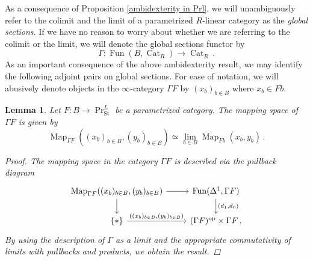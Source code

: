 \documentclass[10pt]{amsart}
\newcommand{\longto}{\longrightarrow}
\theoremstyle{plain}
\newtheorem{lemma}[theorem]{Lemma}
\theoremstyle{definition}
\DeclareMathOperator{\Fun}{Fun}
\DeclareMathOperator{\Map}{Map}
\DeclareMathOperator{\Cat}{Cat}
\newcommand{\St}{\mathrm{St}}
\newcommand{\oop}{\mathrm{op}}
\begin{document}
As a consequence of Proposition \ref{ambidexterity in Prl}, we will unambiguously refer to the colimit and the limit of a parametrized $R$-linear category as the \emph{global sections}.
If we have no reason to worry about whether we are referring to the colimit or the limit, we will denote the global sections functor by
\[
\Gamma : \Fun(B,\Cat_R) \longto \Cat_R \,.
\]
As an important consequence of the above ambidexterity result, we may identify the following adjoint pairs on global sections.
For ease of notation, we will abusively denote objects in the $\infty$-category $\Gamma F$ by $(x_b)_{b \in B}$ where $x_b \in F b$.

\begin{lemma} \label{lem:parametrized_cats_mapping_space}
  Let $F : B \to \Pr^{L}_{\St}$ be a parametrized category. The mapping space of $\Gamma F$ is given by
  \[
  \Map_{\Gamma F}((x_b)_{b \in B},(y_b)_{b \in B}) \simeq \lim_{b \in B} \Map_{Fb}(x_b,y_b) \,.
  \]
  \begin{proof}
    The mapping space in the category $\Gamma F$ is described via the pullback diagram
    \[
    \begin{tikzcd}
      \Map_{\Gamma F}((x_b)_{b \in B},(y_b)_{b \in B}) \arrow[r] \arrow[d] & \Fun(\Delta^1 , \Gamma F) \arrow[d,"{(d_1,d_0)}"] \\
      \{\ast\} \arrow[r,"{((x_b)_{b \in B},(y_b)_{b \in B})}"] & (\Gamma F)^{\oop} \times \Gamma F \,.
    \end{tikzcd}
    \]
    By using the description of $\Gamma$ as a limit and the appropriate commutativity of limits with pullbacks and products, we obtain the result.
  \end{proof}
\end{lemma}
\end{document}
